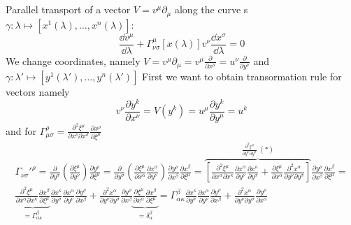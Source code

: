 \chapter{}

\problem

Parallel transport of a vector $V=v^\mu\partial_\mu$ along the curve s
$\gamma:\lambda\mapsto\left[x^1(\lambda),\dots,x^n(\lambda)\right]$:
%
\begin{equation}
    \frac{\dd v^\mu}{\dd\lambda} +
    \Gamma_{\nu\sigma}^{\mu}\left[x(\lambda)\right]v^\nu\frac{\dd x^\sigma}{\dd \lambda}=0
\end{equation}
%
We change coordinates, namely $V = v^\mu\partial_\mu
    = v^\mu\frac{\partial}{\partial x^\mu}=u^\nu\frac{\partial}{\partial y^\nu}$ and
$\gamma:\lambda'\mapsto\left[y^1(\lambda'),\dots,y^n(\lambda')\right]$
%
First we want to obtain transormation rule for vectors namely
%
\begin{equation}
    v^\nu\frac{\partial y^k}{\partial x^\nu}
    = V(y^k) =
    u^\mu\frac{\partial y^k}{\partial y^\mu} = u^k
\end{equation}
%
and for $\Gamma_{\mu\sigma}^\rho=\frac{\partial^2 \xi^\mu}{\partial x^\nu \partial x^\sigma}
    \frac{\partial x^\rho}{\partial\xi^\mu}$
%
\begin{multline}
    \Gamma_{\nu\sigma}'^\rho =
    \frac{\partial}{\partial y^\sigma}
    \left(\frac{\partial \xi^\mu}{\partial y^\nu}\right)
    \frac{\partial y^\rho}{\partial\xi^\mu}=
    \frac{\partial}{\partial y^\sigma}
    \left(\frac{\partial \xi^\mu}{\partial x^\alpha}\frac{\partial x^\alpha}{\partial y^\nu}\right)
    \frac{\partial y^\rho}{\partial x^\beta}\frac{\partial x^\beta}{\partial\xi^\mu}=
    \overbrace{\left[\frac{\partial^2 \xi^\mu}{\partial x^\alpha \partial x^\kappa}
            \frac{\partial x^\alpha}{\partial y^\nu}
            \frac{\partial x^\kappa}{\partial y^\sigma} +
            \frac{\partial \xi^\mu}{\partial x^\alpha}
            \frac{\partial^2 x^\alpha}{\partial y^\nu \partial y^\sigma}\right]}^{
        \frac{\partial^2 \xi^\mu}{\partial y^\nu \partial y^\sigma}~(*)}
    \frac{\partial y^\rho}{\partial x^\beta}\frac{\partial x^\beta}{\partial\xi^\mu}= \\
    \underbrace{\frac{\partial^2 \xi^\mu}{\partial x^\alpha \partial x^\kappa}
        \frac{\partial x^\beta}{\partial\xi^\mu} }_{=\Gamma_{\alpha\kappa}^\beta}
    \frac{\partial x^\kappa}{\partial y^\sigma}
    \frac{\partial x^\alpha}{\partial y^\nu}
    \frac{\partial y^\rho}{\partial x^\beta}
    +
    \frac{\partial^2 x^\alpha}{\partial y^\nu \partial y^\sigma}
    \frac{\partial y^\rho}{\partial x^\beta}
    \underbrace{\frac{\partial \xi^\mu}{\partial x^\alpha}
        \frac{\partial x^\beta}{\partial\xi^\mu}}_{=\delta_\alpha^\beta}=
    \Gamma_{\alpha\kappa}^\beta
    \frac{\partial x^\kappa}{\partial y^\sigma}
    \frac{\partial x^\alpha}{\partial y^\nu}
    \frac{\partial y^\rho}{\partial x^\beta}
    +
    \frac{\partial^2 x^\alpha}{\partial y^\nu \partial y^\sigma}
    \frac{\partial y^\rho}{\partial x^\alpha}
\end{multline}
